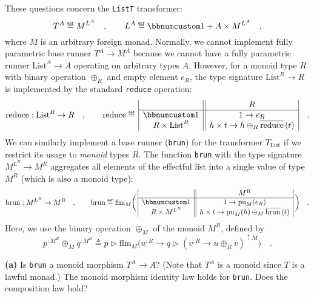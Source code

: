 These questions concern the \lstinline!ListT! transformer: 
\[
T^{A}\triangleq M^{L^{A}}\quad,\quad\quad L^{A}\triangleq\bbnum 1+A\times M^{L^{A}}\quad,
\]
where $M$ is an arbitrary foreign monad. Normally, we cannot implement
fully parametric base runner $T^{A}\rightarrow M^{A}$ because we
cannot have a fully parametric runner $\text{List}^{A}\rightarrow A$
operating on arbitrary types $A$. However, for a monoid type $R$
with binary operation $\oplus_{R}$ and empty element $e_{R}$, the
type signature $\text{List}^{R}\rightarrow R$ is implemented by the
standard \lstinline!reduce! operation: 
\[
\text{reduce}:\text{List}^{R}\rightarrow R\quad,\quad\quad\text{reduce}\triangleq\,\begin{array}{|c||c|}
 & R\\
\hline \bbnum 1 & 1\rightarrow e_{R}\\
R\times\text{List}^{R} & h\times t\rightarrow h\oplus_{R}\overline{\text{reduce}}\,(t)
\end{array}\quad.
\]
We can similarly implement a base runner (\lstinline!brun!) for the
transformer $T_{\text{List}}$ if we restrict its usage to \emph{monoid}
types $R$. The function \lstinline!brun! with the type signature
$M^{L^{R}}\rightarrow M^{R}$ aggregates all elements of the effectful
list into a single value of type $M^{R}$ (which is also a monoid
type):
\[
\text{brun}:M^{L^{R}}\rightarrow M^{R}\quad,\quad\quad\text{brun}\triangleq\text{flm}_{M}\bigg(\,\begin{array}{|c||c|}
 & M^{R}\\
\hline \bbnum 1 & 1\rightarrow\text{pu}_{M}(e_{R})\\
R\times M^{L^{R}} & h\times t\rightarrow\text{pu}_{M}(h)\oplus_{M}\overline{\text{brun}}\,(t)
\end{array}\,\bigg)\quad.
\]
Here, we use the binary operation $\oplus_{M}$ of the monoid $M^{R}$,
defined by
\[
p^{:M^{R}}\oplus_{M}q^{:M^{R}}\triangleq p\triangleright\text{flm}_{M}\big(u^{:R}\rightarrow q\triangleright(v^{:R}\rightarrow u\oplus_{R}v)^{\uparrow M}\big)\quad.
\]

\textbf{(a)} Is \lstinline!brun! a monoid morphism $T^{A}\rightarrow A$?
(Note that $T^{A}$ is a monoid since $T$ is a lawful monad.) The
monoid morphism identity law holds for \lstinline!brun!. Does the
composition law hold?

